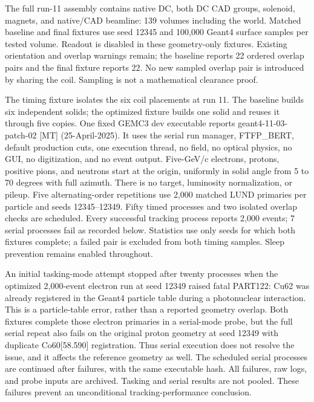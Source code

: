 The full run-11 assembly contains native DC, both DC CAD groups, solenoid, magnets, and native/CAD beamline:
139 volumes including the world. Matched baseline and final fixtures use seed 12345 and 100,000 Geant4 surface
samples per tested volume. Readout is disabled in these geometry-only fixtures. Existing orientation and
overlap warnings remain; the baseline reports 22 ordered overlap pairs and the final fixture reports 22. No
new sampled overlap pair is introduced by sharing the coil. Sampling is not a mathematical clearance proof.

The timing fixture isolates the six coil placements at run 11. The baseline builds six independent solids; the
optimized fixture builds one solid and reuses it through five copies. One fixed GEMC3 dev executable reports
geant4-11-03-patch-02 [MT]   (25-April-2025). It uses the serial run manager, FTFP\_BERT, default production
cuts, one execution thread, no field, no optical physics, no GUI, no digitization, and no event output.
Five-GeV/c electrons, protons, positive pions, and neutrons start at the origin, uniformly in solid angle from
5 to 70 degrees with full azimuth. There is no target, luminosity normalization, or pileup. Five
alternating-order repetitions use 2,000 matched LUND primaries per particle and seeds 12345--12349. Fifty
timed processes and two isolated overlap checks are scheduled. Every successful tracking process reports 2,000
events; 7 serial processes fail as recorded below. Statistics use only seeds for which both fixtures complete;
a failed pair is excluded from both timing samples. Sleep prevention remains enabled throughout.

An initial tasking-mode attempt stopped after twenty processes when the optimized 2,000-event electron run at
seed 12349 raised fatal PART122: Cu62 was already registered in the Geant4 particle table during a
photonuclear interaction. This is a particle-table error, rather than a reported geometry overlap. Both
fixtures complete those electron primaries in a serial-mode probe, but the full serial repeat also fails on
the original proton geometry at seed 12349 with duplicate Co60[58.590] registration. Thus serial execution
does not resolve the issue, and it affects the reference geometry as well. The scheduled serial processes are
continued after failures, with the same executable hash. All failures, raw logs, and probe inputs are
archived. Tasking and serial results are not pooled. These failures prevent an unconditional
tracking-performance conclusion.


